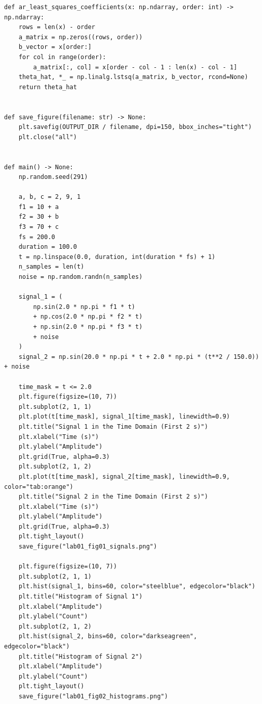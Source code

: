 \documentclass[12pt, a4paper]{article}
\begin{document}
\begin{lstlisting}[caption={Imports, helper functions, signal construction, and time-domain plots for Lab 01.}, label={lst:lab01_time}]
def ar_least_squares_coefficients(x: np.ndarray, order: int) -> np.ndarray:
    rows = len(x) - order
    a_matrix = np.zeros((rows, order))
    b_vector = x[order:]
    for col in range(order):
        a_matrix[:, col] = x[order - col - 1 : len(x) - col - 1]
    theta_hat, *_ = np.linalg.lstsq(a_matrix, b_vector, rcond=None)
    return theta_hat


def save_figure(filename: str) -> None:
    plt.savefig(OUTPUT_DIR / filename, dpi=150, bbox_inches="tight")
    plt.close("all")


def main() -> None:
    np.random.seed(291)

    a, b, c = 2, 9, 1
    f1 = 10 + a
    f2 = 30 + b
    f3 = 70 + c
    fs = 200.0
    duration = 100.0
    t = np.linspace(0.0, duration, int(duration * fs) + 1)
    n_samples = len(t)
    noise = np.random.randn(n_samples)

    signal_1 = (
        np.sin(2.0 * np.pi * f1 * t)
        + np.cos(2.0 * np.pi * f2 * t)
        + np.sin(2.0 * np.pi * f3 * t)
        + noise
    )
    signal_2 = np.sin(20.0 * np.pi * t + 2.0 * np.pi * (t**2 / 150.0)) + noise

    time_mask = t <= 2.0
    plt.figure(figsize=(10, 7))
    plt.subplot(2, 1, 1)
    plt.plot(t[time_mask], signal_1[time_mask], linewidth=0.9)
    plt.title("Signal 1 in the Time Domain (First 2 s)")
    plt.xlabel("Time (s)")
    plt.ylabel("Amplitude")
    plt.grid(True, alpha=0.3)
    plt.subplot(2, 1, 2)
    plt.plot(t[time_mask], signal_2[time_mask], linewidth=0.9, color="tab:orange")
    plt.title("Signal 2 in the Time Domain (First 2 s)")
    plt.xlabel("Time (s)")
    plt.ylabel("Amplitude")
    plt.grid(True, alpha=0.3)
    plt.tight_layout()
    save_figure("lab01_fig01_signals.png")

    plt.figure(figsize=(10, 7))
    plt.subplot(2, 1, 1)
    plt.hist(signal_1, bins=60, color="steelblue", edgecolor="black")
    plt.title("Histogram of Signal 1")
    plt.xlabel("Amplitude")
    plt.ylabel("Count")
    plt.subplot(2, 1, 2)
    plt.hist(signal_2, bins=60, color="darkseagreen", edgecolor="black")
    plt.title("Histogram of Signal 2")
    plt.xlabel("Amplitude")
    plt.ylabel("Count")
    plt.tight_layout()
    save_figure("lab01_fig02_histograms.png")
\end{lstlisting}
\end{document}
